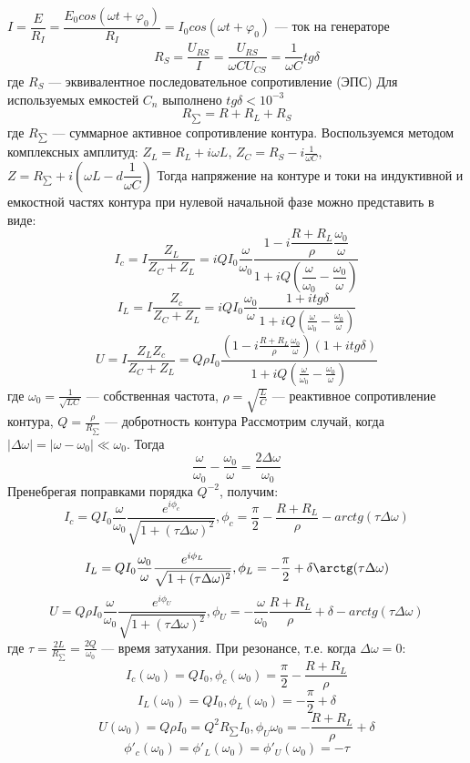 \documentclass[a4paper, 12pt]{article}
\begin{document}
$I=\dfrac{E}{R_I}=\dfrac{E_0cos(\omega t+\varphi_0)}{R_I}=I_0cos(\omega t+\varphi_0)$ --- ток на генераторе\newline
$$R_S=\dfrac{U_{RS}}{I}=\frac{U_{RS}}{\omega CU_{CS}}=\dfrac{1}{\omega C}tg\delta$$
где $R_S$ --- эквивалентное последовательное сопротивление (ЭПС)\newline
Для используемых емкостей $C_n$ выполнено $tg\delta<10^{-3}$\newline
$$R_{\sum}=R+R_L+R_S$$
где $R_{\sum}$ --- суммарное активное сопротивление контура.\newline
Воспользуемся методом комплексных амплитуд:\newline
$Z_L=R_L+i\omega L$, $Z_C=R_S-i\frac{1}{\omega C}$, $Z=R_{\sum}+i(\omega L-d\dfrac{1}{\omega C})$\newline
Тогда напряжение на контуре и токи на индуктивной и емкостной частях контура при нулевой начальной фазе можно представить в виде:\newline
$$I_c=I\dfrac{Z_L}{Z_C+Z_L}=iQI_0\dfrac{\omega}{\omega_0}\dfrac{1-i\dfrac{R+R_L}{\rho}\dfrac{\omega_0}{\omega}}{1+iQ(\dfrac{\omega}{\omega_0}-\dfrac{\omega_0}{\omega})}$$
$$I_L=I\dfrac{Z_c}{Z_C+Z_L}=iQI_0\frac{\omega_0}{\omega}\frac{1+itg\delta}{1+iQ(\frac{\omega}{\omega_0}-\frac{\omega_0}{\omega})}$$
$$U=I\frac{Z_LZ_c}{Z_C+Z_L}=Q\rho I_0\frac{(1-i\frac{R+R_L}{\rho}\frac{\omega_0}{\omega})(1+itg\delta)}{1+iQ(\frac{\omega}{\omega_0}-\frac{\omega_0}{\omega})}$$
где $\omega_0=\frac{1}{\sqrt{LC}}$ --- собственная частота, $\rho=\sqrt{\frac{L}{C}}$ --- реактивное сопротивление контура, $Q=\frac{\rho}{R_{\sum}}$ --- добротность контура\newline
Рассмотрим случай, когда $|\Delta\omega|=|\omega-\omega_0|\ll\omega_0$. Тогда
$$\frac{\omega}{\omega_0}-\frac{\omega_0}{\omega}=\frac{2\Delta\omega}{\omega_0}$$
Пренебрегая поправками порядка $Q^{-2}$, получим:
$$I_c=QI_0\frac{\omega}{\omega_0}\frac{e^{i\phi_c}}{\sqrt{1+(\tau\Delta\omega)^2}},    \phi_c=\frac{\pi}{2}-\frac{R+R_L}{\rho}-arctg(\tau\Delta\omega)$$
$$I_L=QI_0\frac{\omega_0}{\omega}\frac{e^{i\phi_L}}{\sqrt{1+(\tau\Delta\omega)^2}}, \phi_L=-\frac{\pi}{2}+\delta\arctg(\tau\Delta\omega)$$
$$U=Q\rho I_0\frac{\omega}{\omega_0}\frac{e^{i\phi_U}}{\sqrt{1+(\tau\Delta\omega)^2}}, \phi_U=-\frac{\omega}{\omega_0}\frac{R+R_L}{\rho}+\delta-arctg(\tau\Delta\omega)$$
где $\tau=\frac{2L}{R_{\sum}}=\frac{2Q}{\omega_0}$ --- время затухания.\newline
При резонансе, т.е. когда $\Delta\omega=0$:
$$I_c(\omega_0)=QI_0, \phi_c(\omega_0)=\frac{\pi}{2}-\frac{R+R_L}{\rho}$$
$$I_L(\omega_0)=QI_0, \phi_L(\omega_0)=-\frac{\pi}{2}+\delta$$
$$U(\omega_0)=Q\rho I_0=Q^2R_{\sum}I_0, \phi_U{\omega_0}=-\frac{R+R_L}{\rho}+\delta$$
$$\phi'_c(\omega_0)=\phi'_L(\omega_0)=\phi'_U(\omega_0)=-\tau$$
  	
\end{document}
